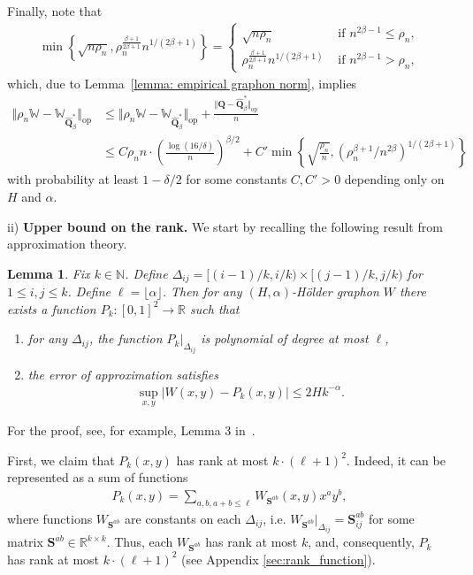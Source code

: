 \documentclass[11pt]{article}
\newcommand{\bbR}{\mathbb{R}}
\newcommand{\op}{\mathrm{op}}
\newcommand{\red}[1]{\textcolor{red}{#1}}
\newcommand{\bQ}{\bm{Q}}
\newcommand{\bQhat}{\widehat{\bm{Q}}}
\newcommand{\bbW}{\mathbb{W}}
\newcommand{\bS}{\bm{S}}
\newcommand{\<}{\langle}
\renewcommand{\>}{\rangle}
\theoremstyle{plain}
\newtheorem{lemma}{Lemma}
\theoremstyle{definition}
\theoremstyle{remark}
\begin{document}
{Finally, note that
\begin{align*}
    \min \left \{ \sqrt{n \rho_n},  \rho_n^{\frac{\beta + 1}{2 \beta + 1}} n^{1/(2 \beta + 1)}\right \} = \begin{cases}
        \sqrt{n \rho_n} & \text{ if } n^{2 \beta - 1} \le \rho_n, \\
        \rho_n^{\frac{\beta + 1}{2 \beta + 1}} n^{1/(2 \beta + 1)} & \text{ if } n^{2 \beta - 1} > \rho_n,
    \end{cases}
\end{align*}
which, due to Lemma~\ref{lemma: empirical graphon norm}, implies
\begin{align}
    \Vert \rho_n \bbW - \bbW_{\bQhat^*_{\beta}} \Vert_{\op}&  \le \Vert \rho_n \bbW - \bbW_{\bQhat^*_{\beta}} \Vert_{\op} + \frac{\Vert \bQ - \bQhat^*_{\beta} \Vert_{\op}}{n} \nonumber \\
    & \le C \rho_n n \cdot \left ( \frac{\log(16/\delta)}{n} \right )^{\beta/2}  + C' \min \left \{\sqrt{\frac{\rho_n}{n}},  \left (\rho_n^{\beta + 1}/n^{2 \beta} \right)^{1/(2 \beta + 1)}\right \}
\label{eq: final bound in the proof of Holder graphon rates}
\end{align}
with probability at least $1 - \delta/2$ for some constants $C, C' > 0$ depending only on $H$ and $\alpha$.



ii) \textbf{Upper bound on the rank.} We start by recalling the following result from approximation theory. 
\begin{lemma}
\label{lemma: Holder function approximation}
	Fix $k \in \mathbb{N}$. Define $\Delta_{ij} = [(i - 1)/k, i/k) \times [(j - 1)/k, j/k)$ for $1 \le i, j \le k$. Define $\ell = \lfloor \alpha \rfloor$. Then for any $(H, \alpha)$-H\"older graphon $W$ there exists a function $P_k: [0, 1]^2 \to \bbR$ such that
	\begin{enumerate}
		\item for any $\Delta_{i j}$, the function $P_k|_{\Delta_{ij}}$ is polynomial of degree at most $\ell$,
		\item the error of approximation satisfies
		\begin{align*}
			\sup_{x, y} |W(x, y) - P_k(x, y)| \le 2 H k^{-\alpha}.
		\end{align*}
	\end{enumerate}
\end{lemma}
For the proof, see, for example, Lemma 3 in~\citep{xu2017}.

First, we claim that $P_k(x, y)$ has rank at most $k \cdot (\ell + 1)^2$. Indeed, it can be represented as a sum of functions
\begin{align*}
	P_k(x, y) = \sum_{a, b, a + b \le \ell} W_{\bS^{ab}}(x,y) x^a y^b,
\end{align*}
where functions $W_{\bS^{ab}}$ are constants on each $\Delta_{ij}$, i.e. $W_{\bS^{ab}}|_{\Delta_{ij}} = \bS^{ab}_{ij}$ for some matrix $\bS^{ab} \in \bbR^{k \times k}$. Thus, each $W_{\bS^{ab}}$ has rank at most $k$, and, consequently, $P_k$ has rank at most $k \cdot (\ell + 1)^2$ (see Appendix \ref{sec:rank_function}). \\

}
\end{document}
